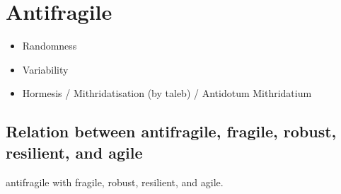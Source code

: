 \section{Antifragile}
\label{sec:tbantifragile}

\begin{itemize}
	\item{Randomness}
	\item{Variability}
	\item{Hormesis / Mithridatisation (by taleb) / Antidotum Mithridatium}
\end{itemize}

\subsection{Relation between antifragile, fragile, robust, resilient, and agile}
\label{sub:tbrelatedtoantifragile}

\gls{antifragile} with \gls{fragile}, \gls{robust}, \gls{resilient}, and \gls{agile}.

